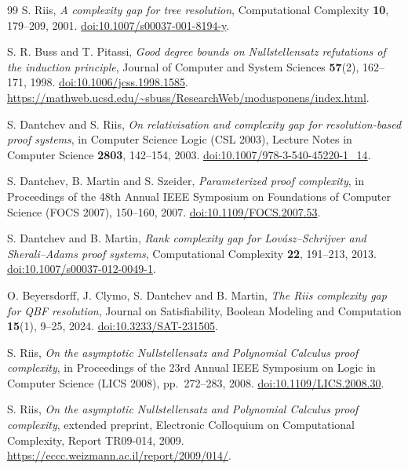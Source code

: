 \documentclass[11pt,a4paper,oneside,openany]{book}
\theoremstyle{definition}\newtheorem{definition}[theorem]{Definition}
\theoremstyle{remark}\newtheorem{remark}[theorem]{Remark}
\numberwithin{equation}{chapter}
\begin{document}
\clearpage
\begin{thebibliography}{99}
\small
\setlength{\itemsep}{0pt}\setlength{\parsep}{0pt}
S. Riis, \emph{A complexity gap for tree resolution},
Computational Complexity \textbf{10}, 179--209, 2001.
\href{https://doi.org/10.1007/s00037-001-8194-y}{doi:10.1007/s00037-001-8194-y}.

S. R. Buss and T. Pitassi, \emph{Good degree bounds on Nullstellensatz
refutations of the induction principle}, Journal of Computer and System
Sciences \textbf{57}(2), 162--171, 1998.
\href{https://doi.org/10.1006/jcss.1998.1585}{doi:10.1006/jcss.1998.1585}.
\url{https://mathweb.ucsd.edu/~sbuss/ResearchWeb/modusponens/index.html}.

S. Dantchev and S. Riis, \emph{On relativisation and complexity gap for
resolution-based proof systems}, in Computer Science Logic (CSL 2003),
Lecture Notes in Computer Science \textbf{2803}, 142--154, 2003.
\href{https://doi.org/10.1007/978-3-540-45220-1_14}{doi:10.1007/978-3-540-45220-1\_14}.

S. Dantchev, B. Martin and S. Szeider, \emph{Parameterized proof complexity},
in Proceedings of the 48th Annual IEEE Symposium on Foundations of Computer Science
(FOCS 2007), 150--160, 2007.
\href{https://doi.org/10.1109/FOCS.2007.53}{doi:10.1109/FOCS.2007.53}.

S. Dantchev and B. Martin, \emph{Rank complexity gap for Lov\'asz--Schrijver
and Sherali--Adams proof systems}, Computational Complexity \textbf{22},
191--213, 2013.
\href{https://doi.org/10.1007/s00037-012-0049-1}{doi:10.1007/s00037-012-0049-1}.

O. Beyersdorff, J. Clymo, S. Dantchev and B. Martin, \emph{The Riis complexity
gap for QBF resolution}, Journal on Satisfiability, Boolean Modeling and
Computation \textbf{15}(1), 9--25, 2024.
\href{https://doi.org/10.3233/SAT-231505}{doi:10.3233/SAT-231505}.

S. Riis, \emph{On the asymptotic Nullstellensatz and Polynomial Calculus proof complexity}, in
Proceedings of the 23rd Annual IEEE Symposium on Logic in Computer Science
(LICS 2008), pp.~272--283, 2008.
\href{https://doi.org/10.1109/LICS.2008.30}{doi:10.1109/LICS.2008.30}.

S. Riis, \emph{On the asymptotic Nullstellensatz and Polynomial Calculus proof complexity}, extended preprint,
Electronic Colloquium on Computational Complexity, Report TR09-014, 2009.
\url{https://eccc.weizmann.ac.il/report/2009/014/}.


\end{thebibliography}
\end{document}
